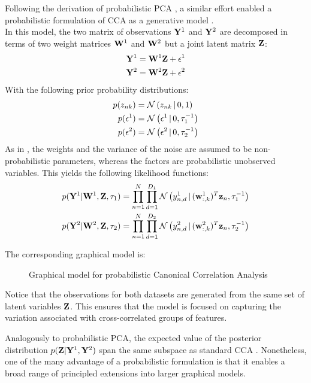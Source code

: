 Following the derivation of probabilistic PCA \cite{Tipping1999}, a similar effort enabled a probabilistic formulation of CCA as a generative model \cite{Bach2005}.\\
In this model, the two matrix of observations ${\bf Y}^{1}$ and ${\bf Y}^{2}$ are decomposed in terms of two weight matrices ${\bf W}^{1}$ and ${\bf W}^{2}$ but a joint latent matrix ${\bf Z}$:
\begin{align*}
	{\bf Y}^{1} &= {\bf W}^{1} {\bf Z} + \epsilon^{1} \\
	{\bf Y}^{2} &= {\bf W}^{2} {\bf Z} + \epsilon^{2}
\end{align*}
With the following prior probability distributions:
\begin{align*}
	p(z_{nk}) &= \mathcal{N}\left(z_{nk} \,|\, 0,1\right) \\
	p(\epsilon^{1}) &= \mathcal{N}\left(\epsilon^{1} \,|\, 0,\tau_{1}^{-1}\right) \\
	p(\epsilon^{2}) &= \mathcal{N}\left(\epsilon^{2} \,|\, 0,\tau_{2}^{-1}\right)
\end{align*}
As in \cite{Tipping1999}, the weights and the variance of the noise are assumed to be non-probabilistic parameters, whereas the factors are probabilistic unobserved variables. This yields the following likelihood functions:
\begin{align} \label{eq:probabilistic_cca_likelihood}
	p({\bf Y}^{1}|{\bf W}^{1},{\bf Z},\tau_{1}) &= \prod_{n=1}^{N} \prod_{d=1}^{D_1} \mathcal{N}\left(y^{1}_{n,d} \,|\, ({\bf w}_{:,k}^{1})^T {\bf z}_{n},\tau_{1}^{-1}\right) \\
	p({\bf Y}^{2}|{\bf W}^{2},{\bf Z},\tau_{2}) &= \prod_{n=1}^{N} \prod_{d=1}^{D_2} \mathcal{N}\left(y^{2}_{n,d} \,|\, ({\bf w}_{:,k}^{2})^T {\bf z}_{n},\tau_{2}^{-1}\right) \nonumber
\end{align}

The corresponding graphical model is:
\begin{figure}[H] \begin{center}
	
	\label{fig:graphical_CCA}
	\caption{Graphical model for probabilistic Canonical Correlation Analysis}
\end{center} \end{figure}

Notice that the observations for both datasets are generated from the same set of latent variables ${\bf Z}$. This ensures that the model is focused on capturing the variation associated with cross-correlated groups of features.

Analogously to probabilistic PCA, the expected value of the posterior distribution $p({\bf Z}|{\bf Y}^{1},{\bf Y}^{2})$ span the same subspace as standard CCA \cite{Bach2005}. Nonetheless, one of the many advantage of a probabilistic formulation is that it enables a broad range of principled extensions into larger graphical models.


